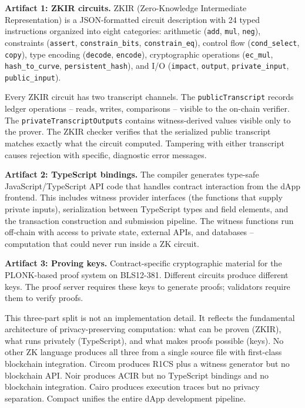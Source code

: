 \documentclass[
  11pt,
  openany]{report}
\renewcommand{\textbf}[1]{{\bfseries\color{MidnightBold}#1}}
\begin{document}
\textbf{Artifact 1: ZKIR circuits.} ZKIR (Zero-Knowledge Intermediate
Representation) is a JSON-formatted circuit description with 24 typed
instructions organized into eight categories: arithmetic (\texttt{add},
\texttt{mul}, \texttt{neg}), constraints (\texttt{assert},
\texttt{constrain\_bits}, \texttt{constrain\_eq}), control flow
(\texttt{cond\_select}, \texttt{copy}), type encoding (\texttt{decode},
\texttt{encode}), cryptographic operations (\texttt{ec\_mul},
\texttt{hash\_to\_curve}, \texttt{persistent\_hash}), and I/O (\texttt{impact},
\texttt{output}, \texttt{private\_input}, \texttt{public\_input}).

Every ZKIR circuit has two transcript channels. The \texttt{publicTranscript}
records ledger operations -- reads, writes, comparisons -- visible to the
on-chain verifier. The \texttt{privateTranscriptOutputs} contains
witness-derived values visible only to the prover. The ZKIR checker verifies
that the serialized public transcript matches exactly what the circuit computed.
Tampering with either transcript causes rejection with specific, diagnostic
error messages.

\textbf{Artifact 2: TypeScript bindings.} The compiler generates type-safe
JavaScript/TypeScript API code that handles contract interaction from the dApp
frontend. This includes witness provider interfaces (the functions that supply
private inputs), serialization between TypeScript types and field elements, and
the transaction construction and submission pipeline. The witness functions run
off-chain with access to private state, external APIs, and databases --
computation that could never run inside a ZK circuit.

\textbf{Artifact 3: Proving keys.} Contract-specific cryptographic material for
the PLONK-based proof system on BLS12-381. Different circuits produce different
keys. The proof server requires these keys to generate proofs; validators
require them to verify proofs.

This three-part split is not an implementation detail. It reflects the
fundamental architecture of privacy-preserving computation: what can be proven
(ZKIR), what runs privately (TypeScript), and what makes proofs possible (keys).
No other ZK language produces all three from a single source file with
first-class blockchain integration. Circom produces R1CS plus a witness
generator but no blockchain API. Noir produces ACIR but no TypeScript bindings
and no blockchain integration. Cairo produces execution traces but no privacy
separation. Compact unifies the entire dApp development pipeline.
\end{document}
